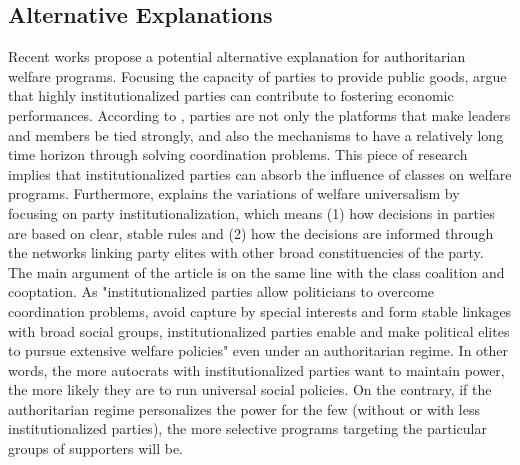 \documentclass[11pt, notitlepage]{article}
\begin{document}
\subsection{Alternative Explanations}

Recent works propose a potential alternative explanation for authoritarian welfare programs. Focusing the capacity of parties to provide public goods, \citet{Bizzarro2018} argue that highly institutionalized parties can contribute to fostering economic performances. According to \citet{Bizzarro2018}, parties are not only the platforms that make leaders and members be tied strongly, and also the mechanisms to have a relatively long time horizon through solving coordination problems. This piece of research implies that institutionalized parties can absorb the influence of classes on welfare programs. Furthermore, \citet{Rasmussen2019} explains the variations of welfare universalism by focusing on party institutionalization, which means (1) how decisions in parties are based on clear, stable rules and (2) how the decisions are informed through the networks linking party elites with other broad constituencies of the party. The main argument of the article is on the same line with the class coalition and cooptation. As "institutionalized parties allow politicians to overcome coordination problems, avoid capture by special interests and form stable linkages with broad social groups, institutionalized parties enable and make political elites to pursue extensive welfare policies" even under an authoritarian regime. In other words, the more autocrats with institutionalized parties want to maintain power, the more likely they are to run universal social policies. On the contrary, if the authoritarian regime personalizes the power for the few (without or with less institutionalized parties), the more selective programs targeting the particular groups of supporters will be. 
\end{document}
